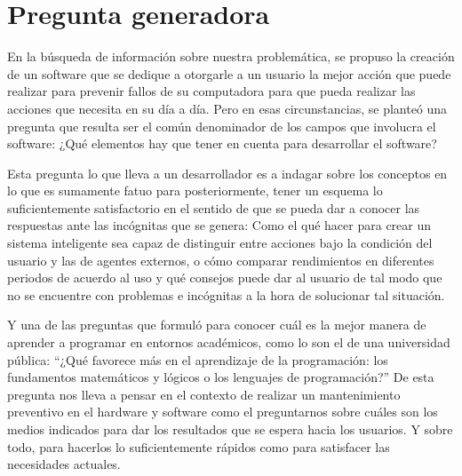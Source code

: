 \pagebreak
\section{Pregunta generadora}

En la búsqueda de información sobre nuestra problemática, se propuso la creación
de un software que se dedique a otorgarle a un usuario la mejor acción que puede
realizar para prevenir fallos de su computadora para que pueda realizar las
acciones que necesita en su día a día. Pero en esas circunstancias, se planteó
una pregunta que resulta ser el común denominador de los campos que involucra el
software: ¿Qué elementos hay que tener en cuenta para desarrollar el software?

Esta pregunta lo que lleva a un desarrollador es a indagar sobre los conceptos
en lo que es sumamente fatuo para posteriormente, tener un esquema lo
suficientemente satisfactorio en el sentido de que se pueda dar a conocer las
respuestas ante las incógnitas que se genera: Como el qué hacer para crear un
sistema inteligente sea capaz de distinguir entre acciones bajo la condición del
usuario y las de agentes externos, o cómo comparar rendimientos en diferentes
periodos de acuerdo al uso y qué consejos puede dar al usuario de tal modo que
no se encuentre con problemas e incógnitas a la hora de solucionar tal
situación.

Y una de las preguntas que formuló \textcite{Trejos2023} para conocer cuál es la
mejor manera de aprender a programar en entornos académicos, como lo son el de
una universidad pública: ``¿Qué favorece más en el aprendizaje de la
programación: los fundamentos matemáticos y lógicos o los lenguajes de
programación?'' De esta pregunta nos lleva a pensar en el contexto de realizar
un mantenimiento preventivo en el hardware y software como el preguntarnos sobre
cuáles son los medios indicados para dar los resultados que se espera hacia los
usuarios. Y sobre todo, para hacerlos lo suficientemente rápidos como para
satisfacer las necesidades actuales.
